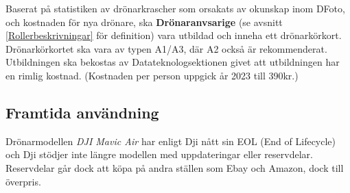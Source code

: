 Baserat på statistiken av drönarkrascher som orsakats av okunskap inom DFoto, och kostnaden för nya drönare, ska \textbf{Drönaranvsarige} (se avsnitt \ref{Rollerbeskrivningar} för definition) vara utbildad och inneha ett drönarkörkort. Drönarkörkortet ska vara av typen A1/A3, där A2 också är rekommenderat. Utbildningen ska bekostas av Datateknologsektionen givet att utbildningen har en rimlig kostnad. (Kostnaden per person uppgick år 2023 till 390kr.)

\subsection{Framtida användning}
\label{Framtida användning}
Drönarmodellen \textit{DJI Mavic Air} har enligt Dji nått sin EOL (End of Lifecycle) och Dji stödjer inte längre modellen med uppdateringar eller reservdelar. Reservdelar går dock att köpa på andra ställen som Ebay och Amazon, dock till överpris. 